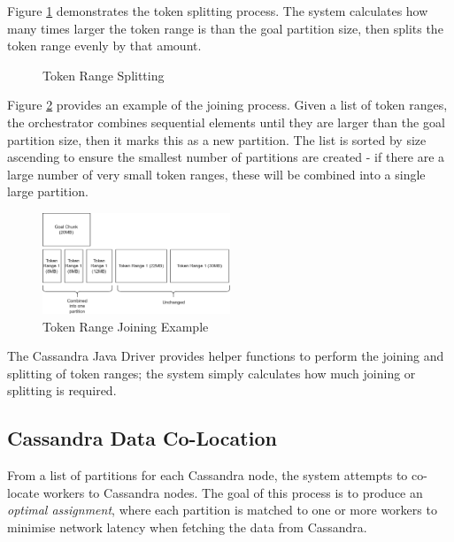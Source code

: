 Figure \ref{fig:cassandra-split-process} demonstrates the token splitting process. The system calculates how many times larger the token range is than the goal partition size, then splits the token range evenly by that amount.

\begin{figure}[h]
	\centering
	\qquad
	\caption{Token Range Splitting}
	\label{fig:cassandra-split-process}
\end{figure}

Figure \ref{fig:cassandra-join-process} provides an example of the joining process. Given a list of token ranges, the orchestrator combines sequential elements until they are larger than the goal partition size, then it marks this as a new partition. The list is sorted by size ascending to ensure the smallest number of partitions are created - if there are a large number of very small token ranges, these will be combined into a single large partition.

\begin{figure}[h]
	\centering
	\includegraphics[width=0.5\textwidth]{chapters/diagrams/implementation/cassandra-join-example}
	\caption{Token Range Joining Example}
	\label{fig:cassandra-join-process}
\end{figure}

The Cassandra Java Driver provides helper functions to perform the joining and splitting of token ranges; the system simply calculates how much joining or splitting is required.

\subsection{Cassandra Data Co-Location}\label{subsec:colocation}
From a list of partitions for each Cassandra node, the system attempts to co-locate workers to Cassandra nodes. The goal of this process is to produce an \textit{optimal assignment}, where each partition is matched to one or more workers to minimise network latency when fetching the data from Cassandra.

